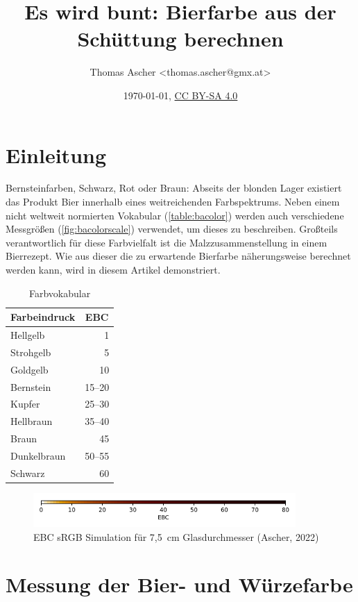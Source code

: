 \documentclass[a4paper,parskip=half]{scrartcl}
\title{Es wird bunt: Bierfarbe aus der Schüttung berechnen}
\author{Thomas Ascher <thomas.ascher@gmx.at>}
\date{\today, \href{http://creativecommons.org/licenses/by-sa/4.0/}{CC BY-SA 4.0}}
\begin{document}
\maketitle

\section*{Einleitung}

Bernsteinfarben, Schwarz, Rot oder Braun: Abseits der blonden Lager existiert das Produkt Bier innerhalb eines weitreichenden Farbspektrums. Neben einem nicht weltweit normierten Vokabular (\autoref{table:bacolor}) werden auch verschiedene Messgrößen (\autoref{fig:bacolorscale}) verwendet, um dieses zu beschreiben. Großteils verantwortlich für diese Farbvielfalt ist die Malzzusammenstellung in einem Bierrezept. Wie aus dieser die zu erwartende Bierfarbe näherungsweise berechnet werden kann, wird in diesem Artikel demonstriert.

\begin{table}[H]
\centering
\begin{tabular}{lr}
\toprule
\multicolumn{1}{c}{\textbf{Farbeindruck}} & \multicolumn{1}{c}{\textbf{EBC}} \\
\midrule
Hellgelb & 1 \\
Strohgelb & 5 \\
Goldgelb & 10 \\
Bernstein & 15–20 \\
Kupfer & 25–30 \\
Hellbraun & 35–40 \\
Braun & 45 \\
Dunkelbraun & 50–55 \\
Schwarz & 60 \\
\bottomrule
\end{tabular}
\caption{Farbvokabular \parencite[34]{Bruecklmeier2018}}
\label{table:bacolor}
\end{table}

\begin{figure}[h]
\centering
\includegraphics[width=10cm]{colorscale.pdf}
\caption{EBC sRGB Simulation für 7,5~cm Glasdurchmesser (Ascher, 2022)}
\label{fig:bacolorscale}
\end{figure}

\section*{Messung der Bier- und Würzefarbe}
\end{document}
